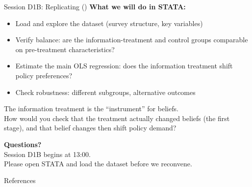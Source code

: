 \documentclass[aspectratio=169, 11pt]{beamer}
\begin{document}
\begin{frame}[t]{Session D1B: Replicating \citeauthor{Settele2022_gender} (\citeyear{Settele2022_gender})}
\vspace{0.3em}
\textbf{What we will do in STATA:}
\vspace{0.3em}
\begin{itemize}
  \setlength\itemsep{0.4em}
  \item Load and explore the dataset (survey structure, key variables)
  \item Verify balance: are the information-treatment and control groups comparable
        on pre-treatment characteristics?
  \item Estimate the main OLS regression:
    does the information treatment shift policy preferences?
  \item Check robustness: different subgroups, alternative outcomes
\end{itemize}
\vspace{0.4em}
\begin{keybox}
  The information treatment is the ``instrument'' for beliefs.\\
  How would you check that the treatment actually changed beliefs
  (the first stage), and that belief changes then shift policy demand?
\end{keybox}
\end{frame}

\begin{frame}
\vfill
\begin{center}
  {\large\bfseries\color{bathnav}Questions?}\\[1em]
  {\small\color{nearblack!70}Session D1B begins at 13:00.}\\[0.5em]
  {\scriptsize\color{nearblack!50}
    Please open STATA and load the dataset before we reconvene.}
\end{center}
\vfill
\end{frame}


\begin{frame}{References}
  \footnotesize
  
\end{frame}

\end{document}

